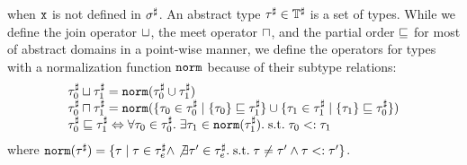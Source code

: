 when $\texttt{x}$ is not defined in ${\sigma}^\sharp$.  An abstract type $\tau^\sharp \in \mathbb{T}^\sharp$ is a
set of types.  While we define the join operator $\sqcup$, the meet operator
$\sqcap$, and the partial order $\sqsubseteq$ for most of abstract domains in a
point-wise manner, we define the operators for types with a normalization
function $\mathtt{norm}$ because of their subtype relations:
\[
  \begin{array}{l}
    \tau^\sharp_0 \sqcup \tau^\sharp_1 = \mathtt{norm}(\tau^\sharp_0 \cup \tau^\sharp_1)\\
    \tau^\sharp_0 \sqcap \tau^\sharp_1 = \mathtt{norm}(
      \{\tau_0 \in \tau^\sharp_0 \mid \{ \tau_0 \} \sqsubseteq \tau^\sharp_1 \} \cup
      \{\tau_1 \in \tau^\sharp_1 \mid \{ \tau_1 \} \sqsubseteq \tau^\sharp_0 \}
    )\\
    \tau^\sharp_0 \sqsubseteq \tau^\sharp_1 \Leftrightarrow \forall \tau_0 \in \tau^\sharp_0. \; \exists
    \tau_1 \in \mathtt{norm}(\tau^\sharp_1). \; \text{s.t.} \; \tau_0 <: \tau_1\\
  \end{array}
\]
where $\mathtt{norm}(\tau^\sharp) = \{ \tau \mid \tau \in \tau^\sharp_e \wedge \not\exists \tau' \in
\tau^\sharp_e. \; \text{s.t.} \; \tau \neq \tau' \wedge \tau <: \tau' \}$.

